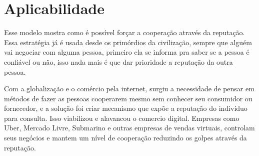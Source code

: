 \section{Aplicabilidade}

Esse modelo mostra como é possível forçar a cooperação através da reputação. Essa estratégia já é usada desde os primórdios da civilização, sempre que alguém vai negociar com alguma pessoa, primeiro ela se informa pra saber se a pessoa é confiável ou não, isso nada mais é que dar prioridade a reputação da outra pessoa.

Com a globalização e o comércio pela internet, surgiu a necessidade de pensar em métodos de fazer as pessoas cooperarem mesmo sem conhecer seu consumidor ou fornecedor, e a solução foi criar mecanismo que expõe a reputação do indivíduo para consulta. Isso viabilizou e alavancou o comercio digital. Empresas como Uber, Mercado Livre, Submarino e outras empresas de vendas virtuais, controlam seus negócios e mantem um nível de cooperação reduzindo os golpes através da reputação.

%


















